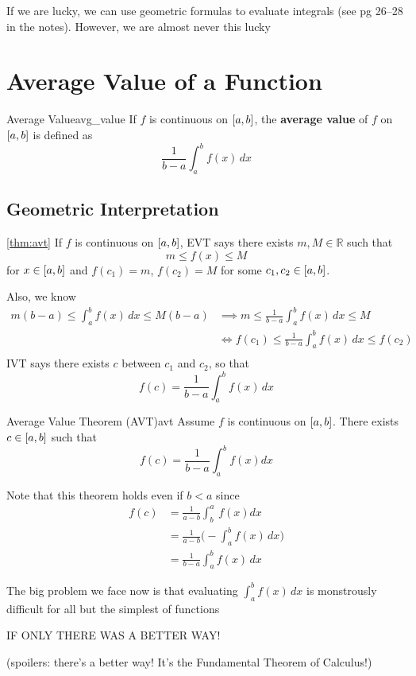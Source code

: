\begin{Remark}{}{}
    If we are lucky, we can use geometric formulas to evaluate integrals
    (see pg 26--28 in the notes). However, we are almost never this lucky\textellipsis{}
\end{Remark}

\section{Average Value of a Function}

\begin{Definition}{Average Value}{avg_value}
    If $ f $ is continuous on $ \interval{a}{b} $, the \textbf{average value} of $ f $
    on $ \interval{a}{b} $ is defined as
    \[ \frac{1}{b-a} \int_{a}^{b} f(x)\,dx \]
\end{Definition}

\subsection{Geometric Interpretation}
\begin{Proof}{\ref{thm:avt}}{}
    If $ f $ is continuous on $ \interval{a}{b} $, EVT says there exists $ m,M\in\mathbb{R} $ such that
    \[m\le f(x) \le M\]
    for $ x\in\interval{a}{b} $ and $ f(c_1)=m $, $ f(c_2)=M $ for some $ c_1,c_2\in\interval{a}{b} $.

    Also, we know
    \begin{align*}
        m(b-a)\le \int_{a}^{b} f(x)\, d{x} \le M(b-a)
         & \implies m\le \frac{1}{b-a} \int_{a}^{b} f(x)\, d{x} \le M       \\
         & \iff f(c_1)\le \frac{1}{b-a} \int_{a}^{b} f(x)\, d{x} \le f(c_2) \\
    \end{align*}
    IVT says there exists $ c $ between $ c_1 $ and $ c_2 $, so that
    \[ f(c)=\frac{1}{b-a} \int_{a}^{b} f(x)\, d{x} \]
\end{Proof}

\begin{Theorem}{Average Value Theorem (AVT)}{avt}
    Assume $ f $ is continuous on $ \interval{a}{b} $.
    There exists $ c\in\interval{a}{b} $ such that
    \[ f(c)=\frac{1}{b-a} \int_{a}^{b} f(x) d{x} \]
\end{Theorem}

\begin{Remark}{}{}
    Note that this theorem holds even if $ b<a $ since
    \begin{align*}
        f(c) & =\frac{1}{a-b} \int_{b}^{a}\, f(x)dx                  \\
             & =\frac{1}{a-b}\biggl(-\int_{a}^{b} f(x)\, d{x}\biggr) \\
             & =\frac{1}{b-a} \int_{a}^{b} f(x)\, d{x}
    \end{align*}
\end{Remark}

The big problem we face now is that evaluating $ \int_{a}^{b} f(x)\, d{x} $ is
monstrously difficult for all but the simplest of functions\textellipsis{}

IF ONLY THERE WAS A BETTER WAY\@!

(spoilers: there's a better way! It's the Fundamental Theorem of Calculus!)

